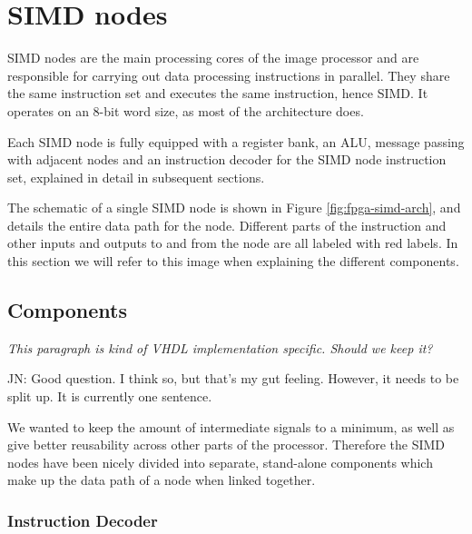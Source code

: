 \section{SIMD nodes}

\ac{SIMD} nodes are the main processing cores of the image processor and are
responsible for carrying out data processing instructions in parallel. They
share the same instruction set and executes the same instruction, hence
\acf{SIMD}. It operates on an 8-bit word size, as most of the architecture does.

Each \ac{SIMD} node is fully equipped with a register bank, an \ac{ALU}, message
passing with adjacent nodes and an instruction decoder for the \ac{SIMD} node
instruction set, explained in detail in subsequent sections.

The schematic of a single \ac{SIMD} node is shown in Figure
\ref{fig:fpga-simd-arch}, and details the entire data path for the
node. Different parts of the instruction and other inputs and outputs to and
from the node are all labeled with red labels. In this
section we will refer to this image when explaining the different components.




\subsection{Components}

{\em \color{red} This paragraph is kind of VHDL implementation specific. Should
  we keep it?

  JN: Good question. I think so, but that's my gut feeling. However, it needs to
  be split up. It is currently one sentence.}

We wanted to keep the amount of intermediate signals to a minimum, as well as
give better reusability across other parts of the processor. Therefore the SIMD
nodes have been nicely divided into separate, stand-alone components which make
up the data path of a node when linked together.

\subsubsection{Instruction Decoder}

